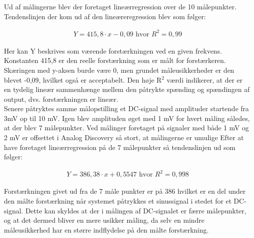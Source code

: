 Ud af målingerne blev der foretaget lineærregression over de 10 målepunkter. Tendenslinjen der kom ud af den lineæreregression blev som følger:

\begin{center}
\begin{align}
 Y = 415,8\cdot x-0,09 \text{     hvor }R^{2} = 0,99
\end{align}
\end{center}

Her kan Y beskrives som værende forstærkningen ved en given frekvens. Konstanten 415,8 er den reelle forstærkning som er målt for forstærkeren. Skæringen med y-aksen burde være 0, men grundet måleusikkerheder er den blevet -0,09, hvilket også er acceptabelt. Den høje R$^2$ værdi indikerer, at der er en tydelig lineær sammenhænge mellem den påtrykte spænding og spændingen af output, dvs. forstærkningen er lineær.\\
Senere påtryktes samme målopstilling et DC-signal med amplituder startende fra 3mV op til 10 mV. Igen blev amplituden øget med 1 mV for hvert måling således, at der blev 7 målepunkter. Ved målinger foretaget på signaler med både 1 mV og 2 mV er offsettet i Analog Discovery så stort, at målingerne er umulige
Efter at have foretaget lineærregression på de 7 målepunkter så tendenslinjen ud som følger:

\begin{center}
\begin{align}
Y = 386,38\cdot x+0,5547\text{     hvor }R^{2} = 0,998
\end{align}
\end{center}

Forstærkningen givet ud fra de 7 måle punkter er på 386 hvilket er en del under den målte forstærkning når systemet påtrykkes et sinussignal i stedet for et DC-signal. Dette kan skyldes at der i målingen af DC-signalet er færre målepunkter, og at det dermed bliver en mere usikker måling, da selv en mindre måleusikkerhed har en større indflydelse på den målte forstærkning.

